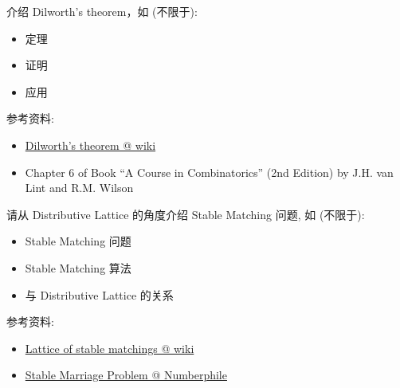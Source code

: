 \documentclass[a4paper, justified]{tufte-handout}
\begin{document}
\begin{solution}
\end{solution}

\begin{problem}[SM Problem 14.75]
\end{problem}

\begin{solution}
\end{solution}

\beginoptional

\begin{problem}
\end{problem}

\begin{solution}
\end{solution}

\beginot

\begin{ot}
  介绍 Dilworth's theorem，如 (不限于):
  \begin{itemize}
    \item 定理
    \item 证明
    \item 应用 
  \end{itemize}

  \noindent 参考资料:
  \begin{itemize}
    \item \href{https://en.wikipedia.org/wiki/Dilworth\%27s\_theorem}{Dilworth's theorem @ wiki}
    \item Chapter 6 of Book ``A Course in Combinatorics'' (2nd Edition) by J.H. van Lint and R.M. Wilson
  \end{itemize}
\end{ot}

\vspace{0.50cm}
\begin{ot}
  请从 Distributive Lattice 的角度介绍 Stable Matching 问题, 如 (不限于):
  \begin{itemize}
    \item Stable Matching 问题 
    \item Stable Matching 算法 
    \item 与 Distributive Lattice 的关系
  \end{itemize}

  \noindent 参考资料:
  \begin{itemize}
    \item \href{https://en.wikipedia.org/wiki/Lattice\_of\_stable\_matchings}{Lattice of stable matchings @ wiki}
    \item \href{https://www.youtube.com/watch?v=Qcv1IqHWAzg}{Stable Marriage Problem @ Numberphile}
  \end{itemize}
\end{ot}
\end{document}
